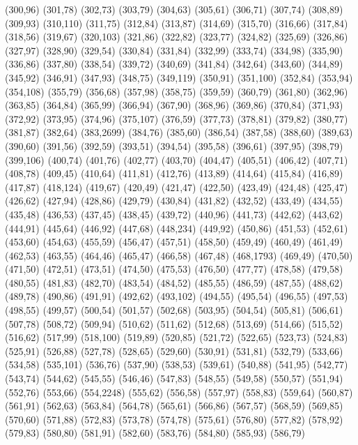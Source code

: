 (300,96)
(301,78)
(302,73)
(303,79)
(304,63)
(305,61)
(306,71)
(307,74)
(308,89)
(309,93)
(310,110)
(311,75)
(312,84)
(313,87)
(314,69)
(315,70)
(316,66)
(317,84)
(318,56)
(319,67)
(320,103)
(321,86)
(322,82)
(323,77)
(324,82)
(325,69)
(326,86)
(327,97)
(328,90)
(329,54)
(330,84)
(331,84)
(332,99)
(333,74)
(334,98)
(335,90)
(336,86)
(337,80)
(338,54)
(339,72)
(340,69)
(341,84)
(342,64)
(343,60)
(344,89)
(345,92)
(346,91)
(347,93)
(348,75)
(349,119)
(350,91)
(351,100)
(352,84)
(353,94)
(354,108)
(355,79)
(356,68)
(357,98)
(358,75)
(359,59)
(360,79)
(361,80)
(362,96)
(363,85)
(364,84)
(365,99)
(366,94)
(367,90)
(368,96)
(369,86)
(370,84)
(371,93)
(372,92)
(373,95)
(374,96)
(375,107)
(376,59)
(377,73)
(378,81)
(379,82)
(380,77)
(381,87)
(382,64)
(383,2699)
(384,76)
(385,60)
(386,54)
(387,58)
(388,60)
(389,63)
(390,60)
(391,56)
(392,59)
(393,51)
(394,54)
(395,58)
(396,61)
(397,95)
(398,79)
(399,106)
(400,74)
(401,76)
(402,77)
(403,70)
(404,47)
(405,51)
(406,42)
(407,71)
(408,78)
(409,45)
(410,64)
(411,81)
(412,76)
(413,89)
(414,64)
(415,84)
(416,89)
(417,87)
(418,124)
(419,67)
(420,49)
(421,47)
(422,50)
(423,49)
(424,48)
(425,47)
(426,62)
(427,94)
(428,86)
(429,79)
(430,84)
(431,82)
(432,52)
(433,49)
(434,55)
(435,48)
(436,53)
(437,45)
(438,45)
(439,72)
(440,96)
(441,73)
(442,62)
(443,62)
(444,91)
(445,64)
(446,92)
(447,68)
(448,234)
(449,92)
(450,86)
(451,53)
(452,61)
(453,60)
(454,63)
(455,59)
(456,47)
(457,51)
(458,50)
(459,49)
(460,49)
(461,49)
(462,53)
(463,55)
(464,46)
(465,47)
(466,58)
(467,48)
(468,1793)
(469,49)
(470,50)
(471,50)
(472,51)
(473,51)
(474,50)
(475,53)
(476,50)
(477,77)
(478,58)
(479,58)
(480,55)
(481,83)
(482,70)
(483,54)
(484,52)
(485,55)
(486,59)
(487,55)
(488,62)
(489,78)
(490,86)
(491,91)
(492,62)
(493,102)
(494,55)
(495,54)
(496,55)
(497,53)
(498,55)
(499,57)
(500,54)
(501,57)
(502,68)
(503,95)
(504,54)
(505,81)
(506,61)
(507,78)
(508,72)
(509,94)
(510,62)
(511,62)
(512,68)
(513,69)
(514,66)
(515,52)
(516,62)
(517,99)
(518,100)
(519,89)
(520,85)
(521,72)
(522,65)
(523,73)
(524,83)
(525,91)
(526,88)
(527,78)
(528,65)
(529,60)
(530,91)
(531,81)
(532,79)
(533,66)
(534,58)
(535,101)
(536,76)
(537,90)
(538,53)
(539,61)
(540,88)
(541,95)
(542,77)
(543,74)
(544,62)
(545,55)
(546,46)
(547,83)
(548,55)
(549,58)
(550,57)
(551,94)
(552,76)
(553,66)
(554,2248)
(555,62)
(556,58)
(557,97)
(558,83)
(559,64)
(560,87)
(561,91)
(562,63)
(563,84)
(564,78)
(565,61)
(566,86)
(567,57)
(568,59)
(569,85)
(570,60)
(571,88)
(572,83)
(573,78)
(574,78)
(575,61)
(576,80)
(577,82)
(578,92)
(579,83)
(580,80)
(581,91)
(582,60)
(583,76)
(584,80)
(585,93)
(586,79)
